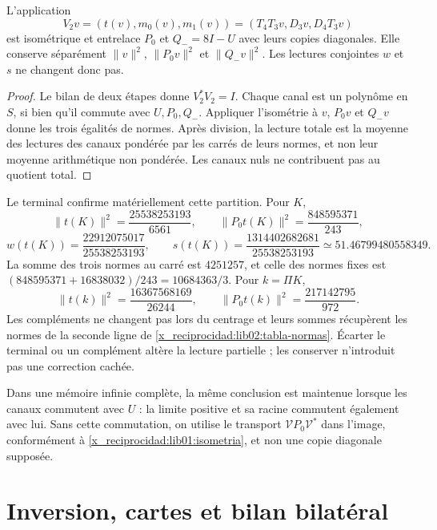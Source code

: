 \begin{proposition}
\label{x_reciprocidad:lib02:memoria-ternaria}
L'application
\[
 V_2v=(t(v),m_0(v),m_1(v))
 =(T_4T_3v,D_3v,D_4T_3v)
\]
est isométrique et entrelace \(P_0\) et \(Q_-=8I-U\) avec leurs
copies diagonales. Elle conserve séparément \(\|v\|^2\),
\(\|P_0v\|^2\) et \(\|Q_-v\|^2\). Les lectures
conjointes \(w\) et \(s\) ne changent donc pas.
\end{proposition}
\begin{proof}
Le bilan de deux étapes donne \(V_2^*V_2=I\). Chaque canal est un polynôme en \(S\), si bien qu'il commute avec \(U,P_0,Q_-\). Appliquer l'isométrie à \(v\), \(P_0v\) et \(Q_-v\) donne les trois égalités de normes. Après division, la lecture totale est la moyenne des lectures des canaux pondérée par les carrés de leurs normes, et non leur moyenne arithmétique non pondérée. Les canaux nuls ne contribuent pas au quotient total.
\end{proof}

Le terminal confirme matériellement cette partition. Pour \(K\),
\[
 \|t(K)\|^2=\frac{25538253193}{6561},\qquad
 \|P_0t(K)\|^2=\frac{848595371}{243},
\]
\[
 w(t(K))=\frac{22912075017}{25538253193},\qquad
 s(t(K))=\frac{1314402682681}{25538253193}
 \simeq51.46799480558349.
\]
La somme des trois normes au carré est \(4251257\), et celle des
normes fixes est
\((848595371+16838032)/243=10684363/3\). Pour \(k=\Pi K\),
\[
 \|t(k)\|^2=\frac{16367568169}{26244},\qquad
 \|P_0t(k)\|^2=\frac{217142795}{972}.
\]
Les compléments ne changent pas lors du centrage et leurs sommes récupèrent les normes
de la seconde ligne de \eqref{x_reciprocidad:lib02:tabla-normas}. Écarter le terminal
ou un complément altère la lecture partielle ; les conserver n’introduit pas
une correction cachée.

Dans une mémoire infinie complète, la même conclusion est maintenue lorsque
les canaux commutent avec \(U\) : la limite positive et sa racine
commutent également avec lui. Sans cette commutation, on utilise le transport
\(\mathcal VP_0\mathcal V^*\) dans l’image, conformément à
\cref{x_reciprocidad:lib01:isometria}, et non une copie diagonale supposée.

\section{Inversion, cartes et bilan bilatéral}
\label{x_reciprocidad:lib02:bidireccional}


